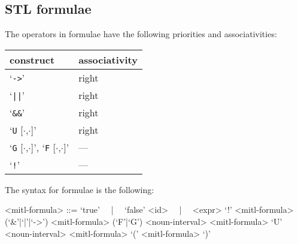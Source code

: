 \documentclass[10pt,a4paper]{article}
\begin{document}
\subsection{STL formulae}

The operators in formulae have the following priorities and associativities:
\begin{table}[ht]
	\centering
    \begin{tabular}{|l|l|} \hline
		construct & associativity \\
		\hline
		`\texttt{->}' & right \\
		`\texttt{||}' & right \\
		`\texttt{\&\&}' & right \\
		`\texttt{U} [$\cdot$,$\cdot$]' & right \\
		`\texttt{G} [$\cdot$,$\cdot$]', `\texttt{F} [$\cdot$,$\cdot$]' & --- \\
		`\texttt{!}' & --- \\
		\hline
	\end{tabular}
\end{table}

The syntax for formulae is the following:
\begin{grammar}
<mitl-formula> ::= `true' ~~|~~ `false'
\alt <id> ~~|~~ <expr>
\alt `!' <mitl-formula>
 (`&'|`|'|`->') <mitl-formula>
\alt (`F'|`G') <noun-interval> <mitl-formula>
 `U' <noun-interval> <mitl-formula>
\alt `(' <mitl-formula> `)'
\end{grammar}
\end{document}

